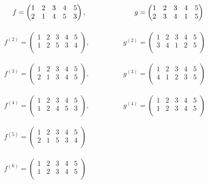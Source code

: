 $\hspace{0.4cm} f = \begin{pmatrix}
1 & 2 & 3 & 4 & 5\\
2 & 1 & 4 & 5 & 3\\
\end{pmatrix}, \hspace{2.4cm} g = \begin{pmatrix}
1 & 2 & 3 & 4 & 5\\
2 & 3 & 4 & 1 & 5\\
\end{pmatrix}$\\~\\

$f^{(2)} = \begin{pmatrix}
1 & 2 & 3 & 4 & 5\\
1 & 2 & 5 & 3 & 4\\
\end{pmatrix}, \hspace{2cm} g^{(2)} = \begin{pmatrix}
1 & 2 & 3 & 4 & 5\\
3 & 4 & 1 & 2 & 5\\
\end{pmatrix}$\\~\\

$f^{(3)} = \begin{pmatrix}
1 & 2 & 3 & 4 & 5\\
2 & 1 & 3 & 4 & 5\\
\end{pmatrix}, \hspace{2cm} g^{(3)} = \begin{pmatrix}
1 & 2 & 3 & 4 & 5\\
4 & 1 & 2 & 3 & 5\\
\end{pmatrix}$\\~\\

$f^{(4)} = \begin{pmatrix}
1 & 2 & 3 & 4 & 5\\
1 & 2 & 4 & 5 & 3\\
\end{pmatrix}, \hspace{2cm} g^{(4)} = \begin{pmatrix}
1 & 2 & 3 & 4 & 5\\
1 & 2 & 3 & 4 & 5\\
\end{pmatrix}$\\~\\

$f^{(5)} = \begin{pmatrix}
1 & 2 & 3 & 4 & 5\\
2 & 1 & 5 & 3 & 4\\
\end{pmatrix}$\\~\\

$f^{(6)} = \begin{pmatrix}
1 & 2 & 3 & 4 & 5\\
1 & 2 & 3 & 4 & 5\\
\end{pmatrix}$

\newpage